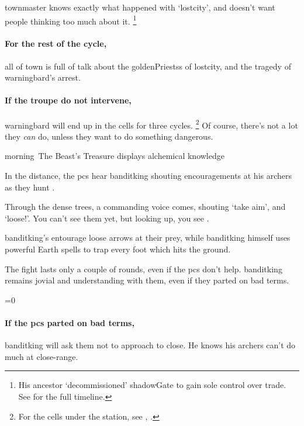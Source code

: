\Gls{townmaster} knows exactly what happened with `\gls{lostcity}', and doesn't want people thinking too much about it.%
\footnote{His ancestor `decommissioned' \gls{shadowGate} to gain sole control over trade.
See  for the full timeline.}

\paragraph{For the rest of the \gls{cycle},}
all of \gls{town} is full of talk about the \glspl{goldenPriests} of \gls{lostcity}, and the tragedy of \gls{warningbard}'s arrest.

\paragraph{If the troupe do not intervene,}
\gls{warningbard} will end up in the cells for three \glspl{cycle}.
\footnote{For the cells under the  station, see , .}
Of course, there's not a lot they \emph{can} do, unless they want to do something dangerous.

\warningbard[\label{warningbard}]

{\gls{morning}~The Beast's Treasure}%
{ displays alchemical knowledge}%

In the distance, the \glspl{pc} hear \gls{banditking} shouting encouragements at his archers as they hunt \localMonster.

\begin{boxtext}
  Through the dense trees, a commanding voice comes, shouting `take aim', and `loose!'.
  You can't see them yet, but looking up, you see \localMonster.
\end{boxtext}

\Gls{banditking}'s entourage loose arrows at their prey, while \gls{banditking} himself uses powerful Earth \glspl{spell} to trap every foot which hits the ground.

The fight lasts only a couple of \glspl{round}, even if the \glspl{pc} don't help.
\Gls{banditking} remains jovial and understanding with them, even if they parted on bad terms.

\ifnum\value{temperature}=0
  \griffin
\else
  \basilisk
\fi

\paragraph{If the \glspl{pc} parted on bad terms,}
\gls{banditking} will ask them not to approach to close.
He knows his archers can't do much at close-range.


